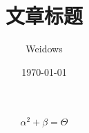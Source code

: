 \documentclass[UTF8]{ctexart}
\title{文章标题}
\author{Weidows}
\date{\today}
\begin{document}
    \maketitle
    $$ \alpha^{2} + \beta = \Theta  $$
\end{document}
